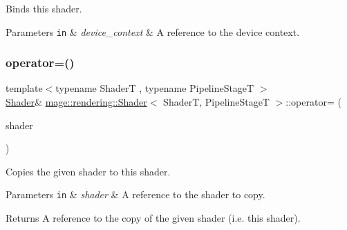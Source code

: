 Binds this shader.


\begin{DoxyParams}[1]{Parameters}
\mbox{\tt in}  & {\em device\+\_\+context} & A reference to the device context. \\
\hline
\end{DoxyParams}
\mbox{\label{classmage_1_1rendering_1_1_shader_a66253b5dd8a5ef1cd766512b4ab15e6c}} 
\subsubsection{\texorpdfstring{operator=()}{operator=()}\hspace{0.1cm}{\footnotesize\ttfamily [1/2]}}
{\footnotesize\ttfamily template$<$typename ShaderT , typename Pipeline\+StageT $>$ \\
\mbox{\hyperlink{classmage_1_1rendering_1_1_shader}{Shader}}\& \mbox{\hyperlink{classmage_1_1rendering_1_1_shader}{mage\+::rendering\+::\+Shader}}$<$ ShaderT, Pipeline\+StageT $>$\+::operator= (\begin{DoxyParamCaption}\item[{const \mbox{\hyperlink{classmage_1_1rendering_1_1_shader}{Shader}}$<$ ShaderT, Pipeline\+StageT $>$ \&}]{shader }\end{DoxyParamCaption})\hspace{0.3cm}{\ttfamily [delete]}}

Copies the given shader to this shader.


\begin{DoxyParams}[1]{Parameters}
\mbox{\tt in}  & {\em shader} & A reference to the shader to copy. \\
\hline
\end{DoxyParams}
\begin{DoxyReturn}{Returns}
A reference to the copy of the given shader (i.\+e. this shader). 
\end{DoxyReturn}
\mbox{\label{classmage_1_1rendering_1_1_shader_a940217c505f3994d1f6057345d52cb36}} 
